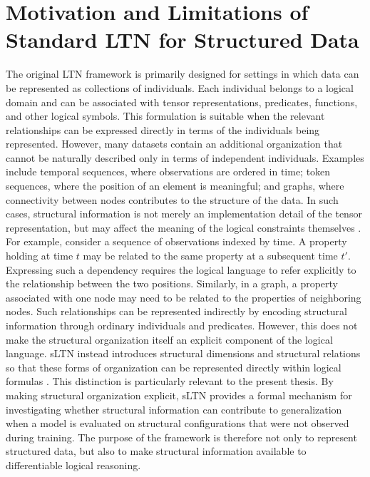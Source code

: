 \section{Motivation and Limitations of Standard LTN for Structured Data}
\noindent
The original LTN framework is primarily designed for settings in which data can be represented as collections of individuals. Each individual belongs to a logical domain and can be associated with tensor representations, predicates, functions, and other logical symbols. This formulation is suitable when the relevant relationships can be expressed directly in terms of the individuals being represented.
However, many datasets contain an additional organization that cannot be naturally described only in terms of independent individuals. Examples include temporal sequences, where observations are ordered in time; token sequences, where the position of an element is meaningful; and graphs, where connectivity between nodes contributes to the structure of the data. In such cases, structural information is not merely an implementation detail of the tensor representation, but may affect the meaning of the logical constraints themselves \cite{rinaldi2026sltn}.
For example, consider a sequence of observations indexed by time. A property holding at time $t$ may be related to the same property at a subsequent time $t'$. Expressing such a dependency requires the logical language to refer explicitly to the relationship between the two positions. Similarly, in a graph, a property associated with one node may need to be related to the properties of neighboring nodes.
Such relationships can be represented indirectly by encoding structural information through ordinary individuals and predicates. However, this does not make the structural organization itself an explicit component of the logical language. sLTN instead introduces structural dimensions and structural relations so that these forms of organization can be represented directly within logical formulas \cite{rinaldi2026sltn}.
This distinction is particularly relevant to the present thesis. By making structural organization explicit, sLTN provides a formal mechanism for investigating whether structural information can contribute to generalization when a model is evaluated on structural configurations that were not observed during training. The purpose of the framework is therefore not only to represent structured data, but also to make structural information available to differentiable logical reasoning.

